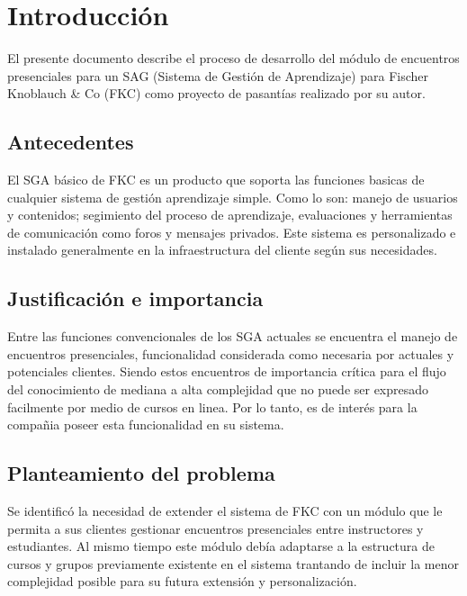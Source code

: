 \chapter*{Introducción}
\thispagestyle{empty} %
 
El presente documento describe el proceso de desarrollo del módulo de encuentros presenciales para un SAG (Sistema de Gestión de Aprendizaje) para Fischer Knoblauch \& Co (FKC) como proyecto de pasantías realizado por su autor.

\section*{Antecedentes}
El SGA básico de FKC es un producto que soporta las funciones basicas de cualquier sistema de gestión aprendizaje simple. Como lo son: manejo de usuarios y contenidos; segimiento del proceso de aprendizaje, evaluaciones y herramientas de comunicación como foros y mensajes privados. Este sistema es personalizado e instalado generalmente en la infraestructura del cliente según sus necesidades.

\section*{Justificación e importancia}
Entre las funciones convencionales de los SGA actuales se encuentra el manejo de encuentros presenciales, funcionalidad considerada como necesaria por actuales y potenciales clientes. Siendo estos encuentros de importancia crítica para el flujo del conocimiento de mediana a alta complejidad que no puede ser expresado facilmente por medio de cursos en linea. Por lo tanto, es de interés para la compañia poseer esta funcionalidad en su sistema.


\section*{Planteamiento del problema}
Se identificó la necesidad de extender el sistema de FKC con un módulo que le permita a sus clientes gestionar encuentros presenciales entre instructores y estudiantes. Al mismo tiempo este módulo debía adaptarse a la estructura de cursos y grupos previamente existente en el sistema trantando de incluir la menor complejidad posible para su futura extensión y personalización.

